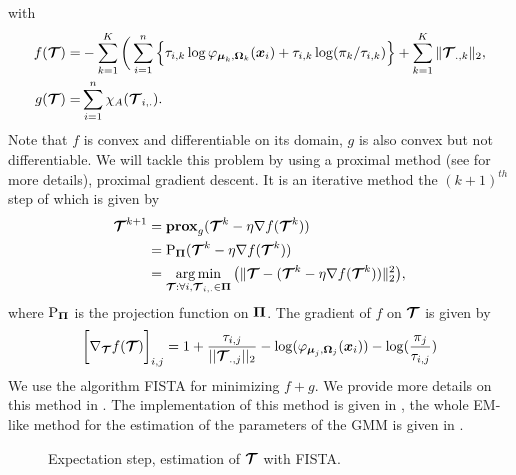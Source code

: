 with
\begin{align*}
f(\boldsymbol{\mathcal T}) =& -\sum_{k=1}^K \bigg(\sum_{i=1}^{n} \Big\{\tau_{i,k}\log\varphi_{\boldsymbol\mu_{k},\boldsymbol\Omega_{k}}(\boldsymbol x_i)+\tau_{i,k} \log(\pi_k/\tau_{i,k})\Big\} + \sum_{k=1}^K \|\boldsymbol{\mathcal T}_{.,k}\|_{2},\\
g(\boldsymbol{\mathcal T}) =& \sum_{i=1}^{n} \chi_A(\boldsymbol{\mathcal T}_{i,.}).
\end{align*}
Note that $f$ is convex and differentiable on its domain, $g$ is also convex but not differentiable. We will tackle this problem by using a proximal method (see \citep{Parikh:2014:PA:2693612.2693613} for more details), proximal gradient descent. It is an iterative method the $(k+1)^{th}$ step of which is given by
\begin{align*}
  \boldsymbol{\mathcal T}^{k+1} &= {\bf{prox}}_{g}(\boldsymbol{\mathcal T}^k - \eta \nabla f(\boldsymbol{\mathcal T}^k))\\
      &= \textnormal{P}_{\boldsymbol\Pi}(\boldsymbol{\mathcal T}^k - \eta \nabla f(\boldsymbol{\mathcal T}^k))\\
      &=\operatorname*{arg\,min}_{ \boldsymbol{\mathcal T} : \forall i, \boldsymbol{\mathcal T}_{i,.} \in \boldsymbol\Pi}\big( \| \boldsymbol{\mathcal T} - (\boldsymbol{\mathcal T}^k - \eta \nabla f(\boldsymbol{\mathcal T}^k) ) \|^2_2 \big),
\end{align*}
where $\textnormal{P}_{\boldsymbol\Pi}$ is the projection function on $\boldsymbol\Pi$. The gradient of $f$ on $\boldsymbol{\mathcal T}$ is given by
\begin{equation}
\bigg[\nabla_{\boldsymbol{\mathcal T}}f(\boldsymbol{\mathcal T})\bigg]_{i,j} = 
1+\frac{\tau_{i,j}}{||\boldsymbol{\mathcal T}_{.,j}||_2}-\log(\varphi_{\boldsymbol\mu_j,\boldsymbol\Omega_j}(\boldsymbol x_i))-\log(\frac{\pi_j}{\tau_{i,j}})
\end{equation}
We use the algorithm FISTA \citep{Beck:2009:FIS:1658360.1658364} for minimizing $f+g$. We provide more details on this method in . The implementation of this method is given in , the whole EM-like method for the estimation of the parameters of the GMM is given in . 
\begin{figure}
\begin{center}
   \caption{Expectation step, estimation of $\boldsymbol{\mathcal T}$ with FISTA.}
   \label{algo:Pen_tau_EM_expect}
\end{center}
\end{figure}


